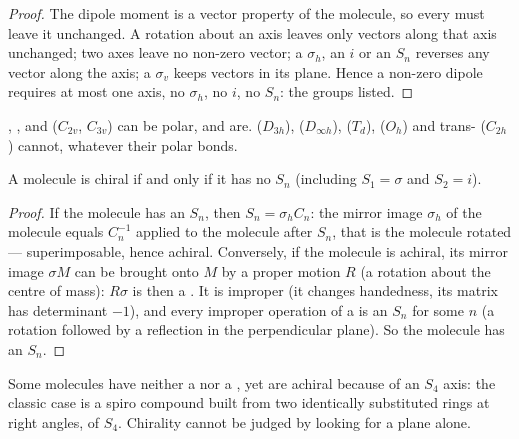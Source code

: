 \begin{proof}
The dipole moment is a vector property of the molecule, so every  must leave it unchanged. A rotation about an axis leaves only
vectors along that axis unchanged; two axes leave no non-zero vector; a
$\sigma_h$, an $i$ or an $S_n$ reverses any vector along the axis; a $\sigma_v$
keeps vectors in its plane. Hence a non-zero dipole requires at most one
axis, no $\sigma_h$, no $i$, no $S_n$: the groups listed.
\end{proof}

\begin{example}\label{ex:b3:point-groups:polar}
, ,  and  ($C_{2v}$, $C_{3v}$) can be polar, and
are.  ($D_{3h}$),  ($D_{\infty h}$),  ($T_d$),  ($O_h$)
and trans- ($C_{2h}$) cannot, whatever their polar bonds.
\end{example}

\begin{theorem}\label{thm:b3:point-groups:chiral}
A molecule is chiral if and only if it has no  $S_n$
(including $S_1 = \sigma$ and $S_2 = i$).
\end{theorem}

\begin{proof}
If the molecule has an $S_n$, then $S_n = \sigma_hC_n$: the mirror image $\sigma_h$
of the molecule equals $C_n^{-1}$ applied to the molecule after $S_n$, that is
the molecule rotated --- superimposable, hence achiral. Conversely, if the
molecule is achiral, its mirror image $\sigma M$ can be brought onto $M$ by a
proper motion $R$ (a rotation about the centre of mass): $R\sigma$ is then a
. It is improper (it changes handedness, its matrix has
determinant $-1$), and every improper operation of a  is an
$S_n$ for some $n$ (a rotation followed by a reflection in the perpendicular
plane). So the molecule has an $S_n$.
\end{proof}

\begin{example}\label{ex:b3:point-groups:s4}
Some molecules have neither a  nor a , yet
are achiral because of an $S_4$ axis: the classic case is a spiro compound
built from two identically substituted rings at right angles, of  $S_4$. Chirality cannot be judged by looking for a plane alone.
\end{example}

